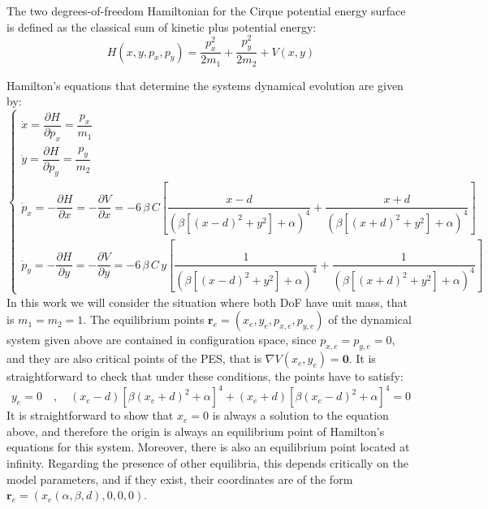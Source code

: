 \documentclass[10pt,aps,onecolumn,superscriptaddress]{revtex4-2}
\begin{document}
The two degrees-of-freedom Hamiltonian for the Cirque potential energy surface is defined as the classical sum of kinetic plus potential energy:
\begin{equation}
H(x,y,p_x,p_y) = \dfrac{p_x^2}{2 m_1} + \dfrac{p_y^2}{2 m_2} + V(x,y)
\label{eq:hamil}
\end{equation}

Hamilton's equations that determine the systems dynamical evolution are given by:
\begin{equation}
    \begin{cases}
    \dot{x} = \dfrac{\partial H}{\partial p_x} = \dfrac{p_x}{m_1} \\[.5cm]
    \dot{y} = \dfrac{\partial H}{\partial p_y} = \dfrac{p_y}{m_2} \\
    \dot{p}_x = - \dfrac{\partial H}{\partial x} = - \dfrac{\partial V}{\partial x} = - 6 \, \beta \, C \left[\dfrac{x - d}{\left(\beta\left[\left(x - d\right)^2 + y^2\right] + \alpha\right)^4} + \dfrac{x + d}{\left(\beta\left[\left(x + d\right)^2 + y^2\right] + \alpha\right)^4}\right] \\[.7cm]
    \dot{p}_y = - \dfrac{\partial H}{\partial y} = - \dfrac{\partial V}{\partial y} = - 6 \, \beta \, C \, y \left[\dfrac{1}{\left(\beta\left[\left(x - d\right)^2 + y^2\right] + \alpha\right)^4} + \dfrac{1}{\left(\beta\left[\left(x + d\right)^2 + y^2\right] + \alpha\right)^4}\right]
    \end{cases}
    \label{eq:ham_eq}
\end{equation}
In this work we will consider the situation where both DoF have unit mass, that is $m_1 = m_2 = 1$. The equilibrium points $\mathbf{r}_e = (x_e,y_e,p_{x,e},p_{y,e})$ of the dynamical system given above are contained in configuration space, since $p_{x,e} = p_{y,e} = 0$, and they are also critical points of the PES, that is $\nabla V (x_e,y_e) = \mathbf{0}$. It is straightforward to check that under these conditions, the points have to satisfy:
\begin{equation}
y_e = 0 \quad , \quad \left(x_e - d\right) \left[\beta\left(x_e + d\right)^2 + \alpha\right]^4 + \left(x_e + d\right) \left[\beta\left(x_e - d\right)^2 + \alpha\right]^4 = 0 
\label{eq:eq_pts}
\end{equation}
It is straightforward to show that $x_e = 0$ is always a solution to the equation above, and therefore the origin is always an equilibrium point of Hamilton's equations for this system. Moreover, there is also an equilibrium point located at infinity. Regarding the presence of other equilibria, this depends critically on the model parameters, and if they exist, their coordinates are of the form $\mathbf{r}_e = (x_e(\alpha,\beta,d),0,0,0)$. 
\end{document}
